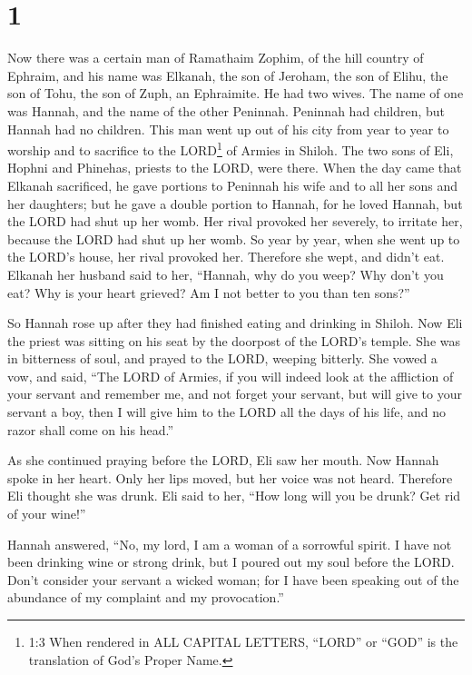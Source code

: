 \hypertarget{section}{%
\section{1}\label{section}}

 Now there was a certain man of Ramathaim Zophim, of the
hill country of Ephraim, and his name was Elkanah, the son of Jeroham,
the son of Elihu, the son of Tohu, the son of Zuph, an Ephraimite.
 He had two wives. The name of one was Hannah, and the name
of the other Peninnah. Peninnah had children, but Hannah had no
children.  This man went up out of his city from year to
year to worship and to sacrifice to the LORD\footnote{1:3 When rendered
  in ALL CAPITAL LETTERS, ``LORD'' or ``GOD'' is the translation of
  God's Proper Name.} of Armies in Shiloh. The two sons of Eli, Hophni
and Phinehas, priests to the LORD, were there.  When the day
came that Elkanah sacrificed, he gave portions to Peninnah his wife and
to all her sons and her daughters;  but he gave a double
portion to Hannah, for he loved Hannah, but the LORD had shut up her
womb.  Her rival provoked her severely, to irritate her,
because the LORD had shut up her womb.  So year by year,
when she went up to the LORD's house, her rival provoked her. Therefore
she wept, and didn't eat.  Elkanah her husband said to her,
``Hannah, why do you weep? Why don't you eat? Why is your heart grieved?
Am I not better to you than ten sons?''

 So Hannah rose up after they had finished eating and
drinking in Shiloh. Now Eli the priest was sitting on his seat by the
doorpost of the LORD's temple.  She was in bitterness of
soul, and prayed to the LORD, weeping bitterly.  She vowed
a vow, and said, ``The LORD of Armies, if you will indeed look at the
affliction of your servant and remember me, and not forget your servant,
but will give to your servant a boy, then I will give him to the LORD
all the days of his life, and no razor shall come on his head.''

 As she continued praying before the LORD, Eli saw her
mouth.  Now Hannah spoke in her heart. Only her lips moved,
but her voice was not heard. Therefore Eli thought she was drunk.
 Eli said to her, ``How long will you be drunk? Get rid of
your wine!''

 Hannah answered, ``No, my lord, I am a woman of a
sorrowful spirit. I have not been drinking wine or strong drink, but I
poured out my soul before the LORD.  Don't consider your
servant a wicked woman; for I have been speaking out of the abundance of
my complaint and my provocation.''

